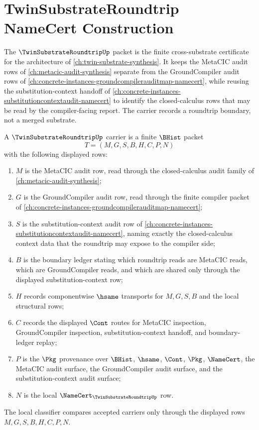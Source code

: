 \chapter{TwinSubstrateRoundtrip NameCert Construction}
\label{ch:concrete-instances-twinsubstrateroundtrip-namecert}

The $\TwinSubstrateRoundtripUp$ packet is the finite cross-substrate certificate for the architecture of \autoref{ch:twin-substrate-synthesis}. It keeps the MetaCIC audit rows of \autoref{ch:metacic-audit-synthesis} separate from the GroundCompiler audit rows of \autoref{ch:concrete-instances-groundcompilerauditmap-namecert}, while reusing the substitution-context handoff of \autoref{ch:concrete-instances-substitutioncontextaudit-namecert} to identify the closed-calculus rows that may be read by the compiler-facing report. The carrier records a roundtrip boundary, not a merged substrate.

\begin{definition}
\label{def:twinsubstrate-roundtrip-carrier}
A $\TwinSubstrateRoundtripUp$ carrier is a finite $\BHist$ packet
$$
T=(M,G,S,B,H,C,P,N)
$$
with the following displayed rows:
\begin{enumerate}
\item $M$ is the MetaCIC audit row, read through the closed-calculus audit family of \autoref{ch:metacic-audit-synthesis};
\item $G$ is the GroundCompiler audit row, read through the finite compiler packet of \autoref{ch:concrete-instances-groundcompilerauditmap-namecert};
\item $S$ is the substitution-context audit row of \autoref{ch:concrete-instances-substitutioncontextaudit-namecert}, naming exactly the closed-calculus context data that the roundtrip may expose to the compiler side;
\item $B$ is the boundary ledger stating which roundtrip reads are MetaCIC reads, which are GroundCompiler reads, and which are shared only through the displayed substitution-context row;
\item $H$ records componentwise $\hsame$ transports for $M,G,S,B$ and the local structural rows;
\item $C$ records the displayed $\Cont$ routes for MetaCIC inspection, GroundCompiler inspection, substitution-context handoff, and boundary-ledger replay;
\item $P$ is the $\Pkg$ provenance over $\BHist$, $\hsame$, $\Cont$, $\Pkg$, $\NameCert$, the MetaCIC audit surface, the GroundCompiler audit surface, and the substitution-context audit surface;
\item $N$ is the local $\NameCert_{\TwinSubstrateRoundtripUp}$ row.
\end{enumerate}
The local classifier compares accepted carriers only through the displayed rows $M,G,S,B,H,C,P,N$.
\end{definition}

